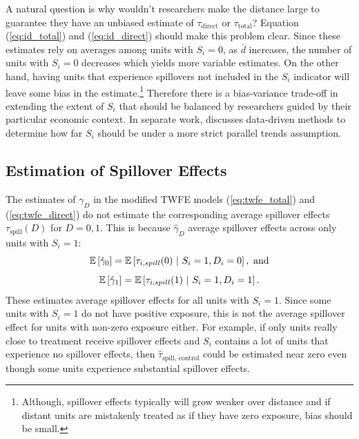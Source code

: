 \documentclass[11pt]{article}
\begin{document}
A natural question is why wouldn't researchers make the distance large to guarantee they have an unbiased estimate of $\tau_{\text{direct}}$ or $\tau_{\text{total}}$? Equation (\ref{eq:id_total}) and (\ref{eq:id_direct}) should make this problem clear. Since these estimates rely on averages among units with $S_i = 0$, as $\bar{d}$ increases, the number of units with $S_i = 0$ decreases which yields more variable estimates. On the other hand, having units that experience spillovers not included in the $S_i$ indicator will leave some bias in the estimate.\footnote{Although, spillover effects typically will grow weaker over distance and if distant units are mistakenly treated as if they have zero exposure, bias should be small.} Therefore there is a bias-variance trade-off in extending the extent of $S_i$ that should be balanced by researchers guided by their particular economic context. In separate work, \citet{Butts_2021} discusses data-driven methods to determine how far $S_i$ should be under a more strict parallel trends assumption.

\subsection{Estimation of Spillover Effects}\label{sec:spill}

The estimates of $\gamma_D$ in the modified TWFE models (\ref{eq:twfe_total}) and (\ref{eq:twfe_direct}) do not estimate the corresponding average spillover effects $\tau_{\text{spill}}(D)$ for $D = 0,1$. This is because $\hat{\gamma}_D$ average spillover effects across only units with $S_i = 1$:
\[ 
    \mathbb{E}\left[\hat{\gamma}_0\right] = \mathbb{E}\left[\tau_{i, spill}(0) \ \vert \  S_i = 1, D_i = 0\right], \text{ and}
\]
\[ 
    \mathbb{E}\left[\hat{\gamma}_1\right] = \mathbb{E}\left[\tau_{i, spill}(1) \ \vert \  S_i = 1, D_i = 1\right].
\]
These estimates average spillover effects for all units with $S_i = 1$. Since some units with $S_i = 1$ do not have positive exposure, this is not the average spillover effect for units with non-zero exposure either. For example, if only units really close to treatment receive spillover effects and $S_i$ contains a lot of units that experience no spillover effects, then $\hat{\tau}_{\text{spill, control}}$ could be estimated near zero even though some units experience substantial spillover effects.
\end{document}
